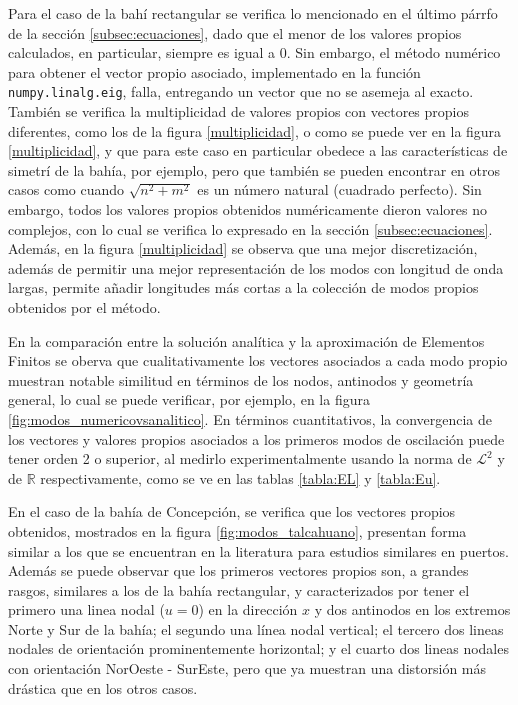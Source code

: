   Para el caso de la bah\'i rectangular se verifica lo mencionado en el \'ultimo p\'arrfo de la secci\'on \ref{subsec:ecuaciones}, dado que el menor de los valores propios calculados, en particular, siempre es igual a 0. Sin embargo, el m\'etodo num\'erico para obtener el vector propio asociado, implementado en la funci\'on \verb;numpy.linalg.eig;, falla, entregando un vector que no se asemeja al exacto. Tambi\'en se verifica la multiplicidad de valores propios con vectores propios diferentes, como los de la figura \ref{multiplicidad}, o como se puede ver en la figura \ref{multiplicidad}, y que para este caso en particular obedece a las caracter\'isticas de simetr\'i de la bah\'ia, por ejemplo, pero que tambi\'en se pueden encontrar en otros casos como cuando $\sqrt{n^2+m^2}$ es un n\'umero natural (cuadrado perfecto). Sin embargo, todos los valores propios obtenidos num\'ericamente dieron valores no complejos, con lo cual se verifica lo expresado en la secci\'on \ref{subsec:ecuaciones}\cite{nica2011}. Adem\'as, en la figura \ref{multiplicidad} se observa que una mejor discretizaci\'on, adem\'as de permitir una mejor representaci\'on de los modos con longitud de onda largas, permite a\~nadir longitudes m\'as cortas a la colecci\'on de modos propios obtenidos por el m\'etodo.
  
  En la comparaci\'on entre la soluci\'on anal\'itica y la aproximaci\'on de Elementos Finitos se oberva que cualitativamente los vectores asociados a cada modo propio muestran notable similitud en t\'erminos de los nodos, antinodos y geometr\'ia general, lo cual se puede verificar, por ejemplo, en la figura \ref{fig:modos_numericovsanalitico}. En t\'erminos cuantitativos, la convergencia de los vectores y valores propios asociados a los primeros modos de oscilaci\'on puede tener orden 2 o superior, al medirlo experimentalmente usando la norma de $\mathcal{L}^2$ y de $\mathbb{R}$ respectivamente, como se ve en las  tablas \ref{tabla:EL} y \ref{tabla:Eu}.
  
  
  En el caso de la bah\'ia de Concepci\'on, se verifica que los vectores propios obtenidos, mostrados en la figura \ref{fig:modos_talcahuano}, presentan forma similar a los que se encuentran en la literatura para estudios similares en puertos. Adem\'as se puede observar que los primeros vectores propios son, a grandes rasgos, similares a los de la bah\'ia rectangular, y caracterizados por tener el primero una linea nodal ($u=0$) en la direcci\'on $x$ y dos antinodos en los extremos Norte y Sur de la bah\'ia; el segundo una l\'inea nodal vertical; el tercero dos lineas nodales de orientaci\'on prominentemente horizontal; y el cuarto dos lineas nodales con orientaci\'on NorOeste - SurEste, pero que ya muestran una distorsi\'on m\'as dr\'astica que en los otros casos. 
  
